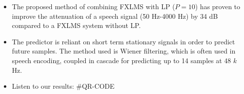 \begin{itemize}
	\item The proposed method of combining FXLMS with LP ($P=10$) has proven to improve the attenuation of a speech signal (50 Hz-4000 Hz) by 34 dB compared to a FXLMS system without LP.
	\item The predictor is reliant on short term stationary signals in order to predict future samples. The method used is Wiener filtering, which is often used in speech encoding, coupled in cascade for predicting up to 14 samples at 48 $k$Hz.
	\item Listen to our results: \#QR-CODE
\end{itemize}
